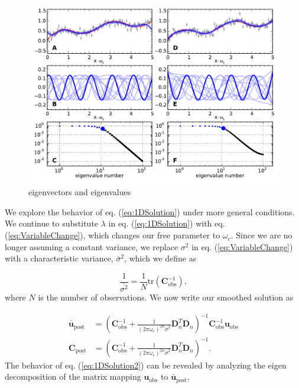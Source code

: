 \documentclass[10pt,a4paper]{article}
\begin{document}
\begin{figure}
\includegraphics[scale=1.0]{figures/figure2}
\caption{eigenvectors and eigenvalues}   
\label{fig:Demo1}
\end{figure}

We explore the behavior of eq. (\ref{eq:1DSolution}) under more general conditions. We continue to substitute $\lambda$ in eq. (\ref{eq:1DSolution}) with eq. (\ref{eq:VariableChange}), which changes our free parameter to $\omega_c$. Since we are no longer assuming a constant variance, we replace $\sigma^2$ in eq. (\ref{eq:VariableChange}) with a characteristic variance, $\bar{\sigma}^2$, which we define as
         
\begin{equation}
\frac{1}{\bar{\sigma^2}} = \frac{1}{N} \mathrm{tr}\left(\mathbf{C}_\mathrm{obs}^{-1}\right),
\end{equation}
where $N$ is the number of observations.  We now write our smoothed solution as

\begin{equation}\label{eq:1DSolution2}
\begin{split}
\mathbf{\bar{u}}_\mathrm{post} &= (\mathbf{C}_\mathrm{obs}^{-1} +   
                   \frac{1}{(2\pi\omega_c)^{2n}\bar{\sigma}^2}\mathbf{D}_n^T\mathbf{D}_n)^{-1}
                   \mathbf{C}_\mathrm{obs}^{-1}
                   \mathbf{u}_\mathrm{obs}
\\
\mathbf{C}_\mathrm{post} &= (\mathbf{C}_\mathrm{obs}^{-1} +   
                            \frac{1}{(2\pi\omega_c)^{2n}\bar{\sigma}^2}\mathbf{D}_n^T\mathbf{D}_n)^{-1}.
\end{split}
\end{equation}
The behavior of eq. (\ref{eq:1DSolution2}) can be revealed by analyzing the eigen decomposition of the matrix mapping $\mathbf{u}_\mathrm{obs}$ to $\mathbf{\bar{u}}_\mathrm{post}$,
\end{document}
